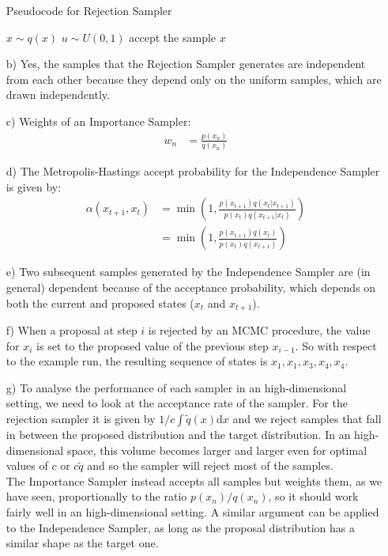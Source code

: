 \documentclass{amsmlaj}
\begin{document}
\begin{problem}
\begin{sol}
\begin{itemize}
\begin{center}
				\begin{minipage}{.7\linewidth}
					\begin{algorithm}[H]
						\DontPrintSemicolon
						\SetNlSty{}{}{:}
						\caption{Pseudocode for Rejection Sampler}
						$x \sim q(x)$\;
						$u \sim U(0, 1)$\;
						 {
							accept the sample $x$\;
						}
					\end{algorithm}
				\end{minipage}
			\end{center}
		\item[b)] Yes, the samples that the Rejection Sampler generates are
			independent from each other because they depend only on the uniform
			samples, which are drawn independently.
		\item[c)] Weights of an Importance Sampler:
			\begin{align}
				w_n&=\frac{p(x_n)}{q(x_n)}
			\end{align}
		\item[d)] The Metropolis-Hastings accept probability for the Independence
			Sampler is given by:
			\begin{align}
				\alpha(x_{t+1},x_t)&=\min\left(
					1,\frac{p(x_{t+1})q(x_t|x_{t+1})}{p(x_t)q(x_{t+1}|x_t)}
				\right) \\
				&=\min\left(
					1,\frac{p(x_{t+1})q(x_t)}{p(x_t)q(x_{t+1})}
				\right)
			\end{align}
		\item[e)] Two subsequent samples generated by the Independence Sampler
			are (in general) dependent because of the acceptance
			probability, which depends on both the current and proposed states
			($x_t$ and $x_{t+1}$).
		\item[f)] When a proposal at step $i$ is rejected by an MCMC procedure, the
			value for $x_i$ is set to the proposed value of the previous step
			$x_{i-1}$. So with respect to the example run, the resulting
			sequence of states is $x_1, x_1, x_3, x_4, x_4$.
		\item[g)] To analyse the performance of each sampler in an high-dimensional
			setting, we need to look at the acceptance rate of the sampler. For
			the rejection sampler it is given by $1/c \int \tilde{q}(x)\mathrm{d}x$
			and we reject samples that fall in between the proposed distribution
			and the target distribution. In an high-dimensional space, this
			volume becomes larger and larger even for optimal values of
			$c$ or $c\tilde{q}$ and so the sampler will reject most of the
			samples. \\
			The Importance Sampler instead accepts all samples but weights them, as we
			have seen, proportionally to the ratio $p(x_n)/q(x_n)$, so it should work
			fairly well in an high-dimensional setting. A similar argument can be
			applied to the Independence Sampler, as long as the proposal distribution
			has a similar shape as the target one.
	\end{itemize}
\end{sol}
\end{problem}
\end{document}
